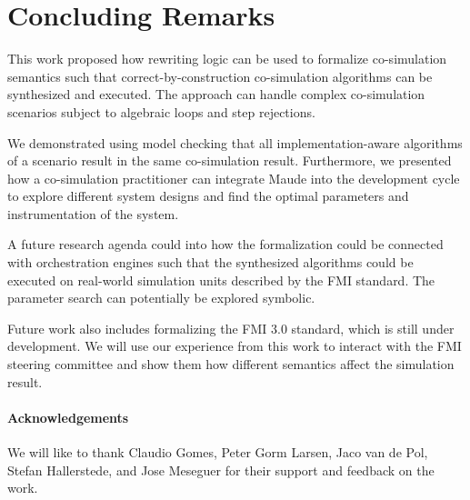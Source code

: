 \section{Concluding Remarks}\label{sc:summary}
This work proposed how rewriting logic can be used to formalize co-simulation semantics such that correct-by-construction co-simulation algorithms can be synthesized and executed.
The approach can handle complex co-simulation scenarios subject to algebraic loops and step rejections.

We demonstrated using model checking that all implementation-aware algorithms of a scenario result in the same co-simulation result.
Furthermore, we presented how a co-simulation practitioner can integrate Maude into the development cycle to explore different system designs and find the optimal parameters and instrumentation of the system.

A future research agenda could into how the formalization could be connected with orchestration engines such that the synthesized algorithms could be executed on real-world simulation units described by the FMI standard.
The parameter search can potentially be explored symbolic.

Future work also includes formalizing the FMI 3.0 standard, which is still under development.
We will use our experience from this work to interact with the FMI steering committee and show them how different semantics affect the simulation result.

\paragraph{Acknowledgements}
We will like to thank Claudio Gomes, Peter Gorm Larsen, Jaco van de Pol, Stefan Hallerstede, and Jose Meseguer for their support and feedback on the work.